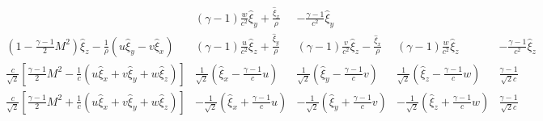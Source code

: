 \begin{align*}
\begin{array}{c|c|c|c|c}
&
\left(\gamma-1\right)\frac{w}{c^2}\hat{\xi}_y+\frac{\hat{\xi}_x}{\rho}
&
-\frac{\gamma-1}{c^2}\hat{\xi}_y
\\ \hline
\left(1-\frac{\gamma -1}{2}M^2\right)\hat{\xi}_z-\frac{1}{\rho}\left(u\hat{\xi}_y-v\hat{\xi}_x\right)
&
\left(\gamma-1\right)\frac{u}{c^2}\hat{\xi}_z+\frac{\hat{\xi}_y}{\rho}
&
\left(\gamma-1\right)\frac{v}{c^2}\hat{\xi}_z-\frac{\hat{\xi}_x}{\rho}
&
\left(\gamma-1\right)\frac{w}{c^2}\hat{\xi}_z
&
-\frac{\gamma-1}{c^2}\hat{\xi}_z
\\ \hline
\frac{c}{\sqrt{2}}\left[\frac{\gamma-1}{2}M^2-\frac{1}{c}\left(u\hat{\xi}_x+v\hat{\xi}_y+w\hat{\xi}_z\right)\right]
&
\frac{1}{\sqrt{2}}\left(\hat{\xi}_x-\frac{\gamma-1}{c}u\right)
&
\frac{1}{\sqrt{2}}\left(\hat{\xi}_y-\frac{\gamma-1}{c}v\right)
&
\frac{1}{\sqrt{2}}\left(\hat{\xi}_z-\frac{\gamma-1}{c}w\right)
&
\frac{\gamma-1}{\sqrt{2} c}
\\ \hline
\frac{c}{\sqrt{2}}\left[\frac{\gamma-1}{2}M^2+\frac{1}{c}\left(u\hat{\xi}_x+v\hat{\xi}_y+w\hat{\xi}_z\right)\right]
&
-\frac{1}{\sqrt{2}}\left(\hat{\xi}_x+\frac{\gamma-1}{c}u\right)
&
-\frac{1}{\sqrt{2}}\left(\hat{\xi}_y+\frac{\gamma-1}{c}v\right)
&
-\frac{1}{\sqrt{2}}\left(\hat{\xi}_z+\frac{\gamma-1}{c}w\right)
&
\frac{\gamma-1}{\sqrt{2} c}
\end{array}
\end{align*}


